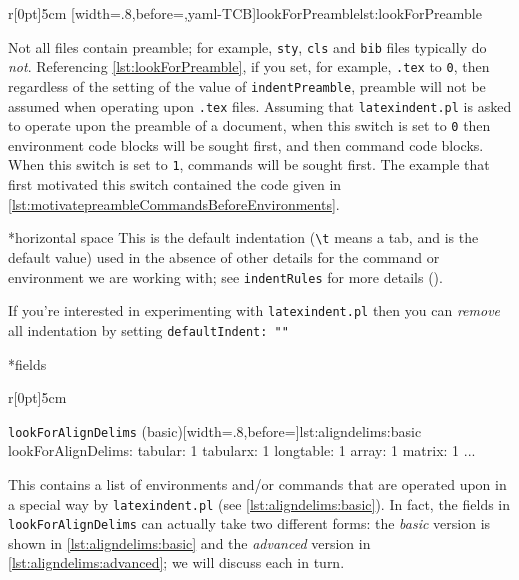\begin{wrapfigure}[8]{r}[0pt]{5cm}
[width=.8\linewidth,before=\centering,yaml-TCB]{lookForPreamble}{lst:lookForPreamble}
\end{wrapfigure}
Not all files contain preamble; for example, \texttt{sty}, \texttt{cls} and \texttt{bib} files typically do \emph{not}. Referencing
\cref{lst:lookForPreamble}, if you set, for example, \texttt{.tex} to \texttt{0}, then regardless of the setting of the value of \texttt{indentPreamble}, preamble
will not be assumed when operating upon \texttt{.tex} files.
Assuming that \texttt{latexindent.pl} is asked to operate upon the preamble of a document,
when this switch is set to \texttt{0} then environment code blocks will be sought first, 
and then command code blocks. When this switch is set to \texttt{1}, commands 
will be sought first. The example that first motivated this switch contained the code given in \cref{lst:motivatepreambleCommandsBeforeEnvironments}.


*{horizontal space}
This is the default indentation (\lstinline!\t! means a tab, and is the default value) used in the absence of other details
for the command or environment we are working with; see \texttt{indentRules}
for more details ().

If you're interested in experimenting with \texttt{latexindent.pl} then you
can \emph{remove} all indentation by setting \texttt{defaultIndent: ""}



*{fields}
\begin{wrapfigure}[12]{r}[0pt]{5cm}
\begin{yaml}[numbers=none]{\texttt{lookForAlignDelims} (basic)}[width=.8\linewidth,before=\centering]{lst:aligndelims:basic}
lookForAlignDelims:
   tabular: 1
   tabularx: 1
   longtable: 1
   array: 1
   matrix: 1
   ...
	\end{yaml}
  \end{wrapfigure}
This contains a list of environments and/or commands that 
are operated upon in a special way by \texttt{latexindent.pl} (see \cref{lst:aligndelims:basic}).
In fact, the fields in \texttt{lookForAlignDelims} can actually
take two different forms: the \emph{basic} version is shown in \cref{lst:aligndelims:basic}
and the \emph{advanced} version in \cref{lst:aligndelims:advanced}; we will discuss each in turn.

